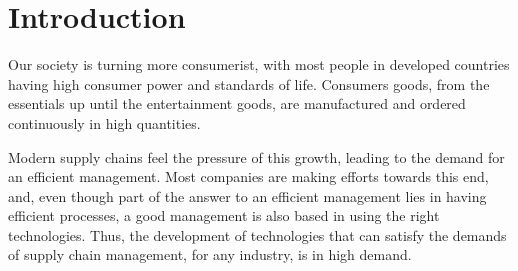 \chapter{Introduction}
\label{chap:introduction}
\minitoc \mtcskip \noindent

Our society is turning more consumerist, with most people in developed countries having high consumer power and standards of life. Consumers goods, from the essentials up until the entertainment goods, are manufactured and ordered continuously in high quantities.

Modern supply chains feel the pressure of this growth, leading to the demand for an efficient management. Most companies are making efforts towards this end, and, even though part of the answer to an efficient management lies in having efficient processes, a good management is also based in using the right technologies. Thus, the development of technologies that can satisfy the demands of supply chain management, for any industry, is in high demand.



